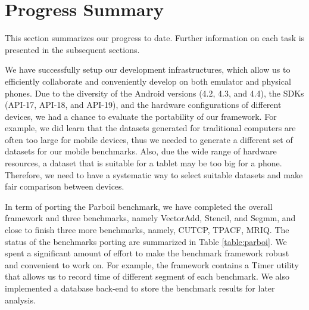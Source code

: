 
\section*{Progress Summary}

This section summarizes our progress to date. Further information on each task
is presented in the subsequent sections.

We have successfully setup our development infrastructures, which allow us to
efficiently collaborate and conveniently develop on both emulator and physical
phones.  Due to the diversity of the Android versions (4.2, 4.3, and 4.4), the
SDKs (API-17, API-18, and API-19), and the hardware configurations of different
devices, we had a chance to evaluate the portability of our framework. For
example, we did learn that the datasets generated for traditional computers are
often too large for mobile devices, thus we needed to generate a different set
of datasets for our mobile benchmarks. Also, due the wide range of hardware
resources, a dataset that is suitable for a tablet may be too big for a phone.
Therefore, we need to have a systematic way to select suitable datasets and
make fair comparison between devices.


In term of porting the Parboil benchmark, we have completed the overall
framework and three benchmarks, namely VectorAdd, Stencil, and Segmm, and close
to finish three more benchmarks, namely, CUTCP, TPACF, MRIQ. The status of the
benchmarks porting are summarized in Table \ref{table:parboi}. We spent a significant amount of
effort to make the benchmark framework robust and convenient to work on. For
example, the framework contains a Timer utility that allows us to record time
of different segment of each benchmark. We also implemented a database back-end
to store the benchmark results for later analysis.


